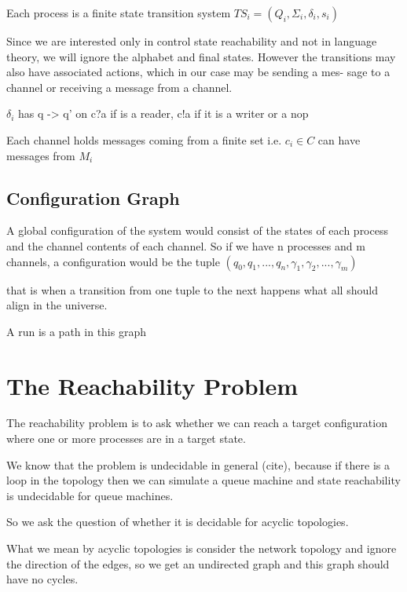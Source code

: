 \documentclass[a4paper,UKenglish,cleveref, autoref, thm-restate]{lipics-v2019}
\begin{document}
Each process is a finite state transition system $TS_i = (Q_i, \Sigma_i, \delta_i, s_i)$

Since we are interested only in control state reachability and not in language
theory, we will ignore the alphabet and final states. However the transitions
may also have associated actions, which in our case may be sending a mes-
sage to a channel or receiving a message from a channel. 


$\delta_i$ has q -> q' on  c?a if is a reader, c!a if it is a writer or a nop


Each channel holds messages coming from a finite set i.e. $c_i \in C$ can have messages from $M_i$ 

\subsection{Configuration Graph}

A global configuration of the system would consist of the states of each process and the channel contents of each channel. So if we have n processes and m channels, a configuration would be the tuple $(q_0, q_1, ..., q_n, \gamma_1, \gamma_2, ..., \gamma_m)$



that is when a transition from one tuple to the next happens what all should align in the universe.

A run is a path in this graph 


\section{The Reachability Problem}

The reachability problem is to ask whether we can reach a target configuration where one or more processes are in a target state.

We know that the problem is undecidable in general (cite), because if there is a loop in the topology then we can simulate a queue machine and state reachability is undecidable for queue machines. 

So we ask the question of whether it is decidable for acyclic topologies.

What we mean by acyclic topologies is consider the network topology and ignore the direction of the edges, so we get an undirected graph and this graph should have no cycles.
\end{document}
